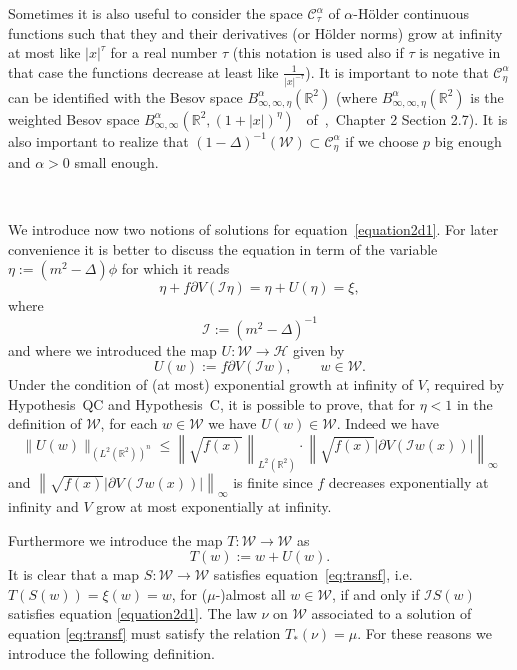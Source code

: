 \documentclass[a4paper,10pt]{article}
\newcommand{\assign}{:=}
\newcommand{\asterisk}{\mathord{*}}
\newcommand{\tmname}[1]{\textsc{#1}}
\begin{document}
Sometimes it is also useful to consider the space
$\mathcal{C}^{\alpha}_{\tau}$ of $\alpha$-H{\tmname{}}{\"o}lder continuous
functions such that they and their derivatives (or H{\"o}lder norms) grow at
infinity at most like $| x |^{\tau}$ for a real number $\tau$ (this notation
is used also if $\tau$ is negative in that case the functions decrease at
least like $\frac{1}{| x |^{- \tau}}$). It is important to note that
$\mathcal{C}^{\alpha}_{\eta}$ can be identified with the Besov space
$B^{\alpha}_{\infty, \infty, \eta} (\mathbb{R}^2)$ (where $B^{\alpha}_{\infty,
\infty, \eta} (\mathbb{R}^2)$ is the weighted Besov space $B^{\alpha}_{\infty,
\infty} (\mathbb{R}^2, (1 + | x |)^{\eta})$ \ of~{\cite{Bahouri2011}},~Chapter
2 Section 2.7). It is also important to realize that $(1 - \Delta)^{- 1}
(\mathcal{W}) \subset \mathcal{C}^{\alpha}_{\eta}$ if we choose $p$ big enough
and $\alpha > 0$ small enough.

\

We introduce now two notions of solutions for equation~{\eqref{equation2d1}}.
For later convenience it is better to discuss the equation in term of the
variable $\eta \assign (m^2 - \Delta) \phi$ for which it reads
\begin{equation}
  \eta + f \partial V (\mathcal{I} \eta) = \eta + U (\eta) = \xi,
  \label{eq:transf}
\end{equation}
where
\[ \mathcal{I} \assign (m^2 - \Delta)^{- 1} \]
and where we introduced the map $U : \mathcal{W} \rightarrow \mathcal{H}$
given by
\begin{equation}
  U (w) \assign f \partial V (\mathcal{I}w) \label{equationU}, \qquad w \in
  \mathcal{W}.
\end{equation}
Under the condition of (at most) exponential growth at infinity of $V$,
required by Hypothesis~QC and Hypothesis~C, it is possible to prove, that for
$\eta < 1$ in the definition of $\mathcal{W}$, for each $w \in \mathcal{W}$ we
have $U (w) \in \mathcal{W}$. Indeed we have
\[ \| U (w) \|_{(L^2 (\mathbb{R}^2))^n} \leq \left\| \sqrt{f (x)}
   \right\|_{L^2 (\mathbb{R}^2)} \cdot \left\| \sqrt{f (x)} | \partial V
   (\mathcal{I} w (x)) | \right\|_{\infty} \]
and $\left\| \sqrt{f (x)} | \partial V (\mathcal{I} w (x)) |
\right\|_{\infty}$ is finite since $f$ decreases exponentially at infinity and
$V$ grow at most exponentially at infinity.

Furthermore we introduce the map $T : \mathcal{W} \rightarrow \mathcal{W}$ as
\[ T (w) \assign w + U (w) . \]
It is clear that a map $S : \mathcal{W} \rightarrow \mathcal{W}$ satisfies
equation~{\eqref{eq:transf}}, i.e. $T (S (w)) = \xi (w) = w$, for
($\mu$-)almost all $w \in \mathcal{W}$, if and only if $\mathcal{I}S (w)$
satisfies equation {\eqref{equation2d1}}. The law $\nu$ on $\mathcal{W}$
associated to a solution of equation {\eqref{eq:transf}} must satisfy the
relation $T_{\asterisk}^{} (\nu) = \mu$. For these reasons we introduce the
following definition.
\end{document}
